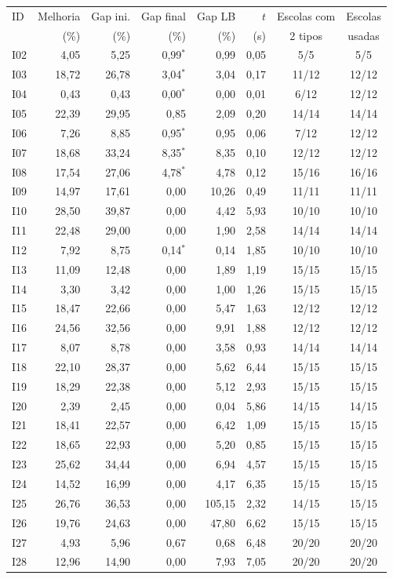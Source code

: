 \begin{tabular}{l rrrrr cc}
\hline
ID & Melhoria & Gap ini. & Gap final & Gap LB & $t$ & Escolas com & Escolas \\
 & (\%) & (\%) & (\%) & (\%) & (s) & 2 tipos & usadas \\
\hline
I02 & 4,05 & 5,25 & 0,99$^*$ & 0,99 & 0,05 & 5/5 & 5/5 \\
I03 & 18,72 & 26,78 & 3,04$^*$ & 3,04 & 0,17 & 11/12 & 12/12 \\
I04 & 0,43 & 0,43 & 0,00$^*$ & 0,00 & 0,01 & 6/12 & 12/12 \\
I05 & 22,39 & 29,95 & 0,85 & 2,09 & 0,20 & 14/14 & 14/14 \\
I06 & 7,26 & 8,85 & 0,95$^*$ & 0,95 & 0,06 & 7/12 & 12/12 \\
I07 & 18,68 & 33,24 & 8,35$^*$ & 8,35 & 0,10 & 12/12 & 12/12 \\
I08 & 17,54 & 27,06 & 4,78$^*$ & 4,78 & 0,12 & 15/16 & 16/16 \\
I09 & 14,97 & 17,61 & 0,00 & 10,26 & 0,49 & 11/11 & 11/11 \\
I10 & 28,50 & 39,87 & 0,00 & 4,42 & 5,93 & 10/10 & 10/10 \\
I11 & 22,48 & 29,00 & 0,00 & 1,90 & 2,58 & 14/14 & 14/14 \\
I12 & 7,92 & 8,75 & 0,14$^*$ & 0,14 & 1,85 & 10/10 & 10/10 \\
I13 & 11,09 & 12,48 & 0,00 & 1,89 & 1,19 & 15/15 & 15/15 \\
I14 & 3,30 & 3,42 & 0,00 & 1,00 & 1,26 & 15/15 & 15/15 \\
I15 & 18,47 & 22,66 & 0,00 & 5,47 & 1,63 & 12/12 & 12/12 \\
I16 & 24,56 & 32,56 & 0,00 & 9,91 & 1,88 & 12/12 & 12/12 \\
I17 & 8,07 & 8,78 & 0,00 & 3,58 & 0,93 & 14/14 & 14/14 \\
I18 & 22,10 & 28,37 & 0,00 & 5,62 & 6,44 & 15/15 & 15/15 \\
I19 & 18,29 & 22,38 & 0,00 & 5,12 & 2,93 & 15/15 & 15/15 \\
I20 & 2,39 & 2,45 & 0,00 & 0,04 & 5,86 & 14/15 & 14/15 \\
I21 & 18,41 & 22,57 & 0,00 & 6,42 & 1,09 & 15/15 & 15/15 \\
I22 & 18,65 & 22,93 & 0,00 & 5,20 & 0,85 & 15/15 & 15/15 \\
I23 & 25,62 & 34,44 & 0,00 & 6,94 & 4,57 & 15/15 & 15/15 \\
I24 & 14,52 & 16,99 & 0,00 & 4,17 & 6,35 & 15/15 & 15/15 \\
I25 & 26,76 & 36,53 & 0,00 & 105,15 & 2,32 & 14/15 & 15/15 \\
I26 & 19,76 & 24,63 & 0,00 & 47,80 & 6,62 & 15/15 & 15/15 \\
I27 & 4,93 & 5,96 & 0,67 & 0,68 & 6,48 & 20/20 & 20/20 \\
I28 & 12,96 & 14,90 & 0,00 & 7,93 & 7,05 & 20/20 & 20/20 \\
\hline
\end{tabular}
